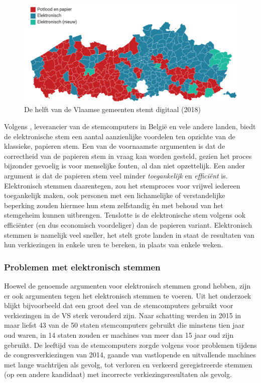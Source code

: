 			\begin{figure}
				\includegraphics[width=\linewidth]{img/evote_vlaanderen.png}
				\caption{De helft van de Vlaamse gemeenten stemt digitaal (2018)}
				\label{fig:evote_vlaanderen}
			\end{figure}
			
			Volgens \textcite{Smartmatic2018}, leverancier van de stemcomputers in België en vele andere landen, biedt de elektronische stem een aantal aanzienlijke voordelen ten opzichte van de klassieke, papieren stem. Een van de voornaamste argumenten is dat de correctheid van de papieren stem in vraag kan worden gesteld, gezien het proces bijzonder gevoelig is voor menselijke fouten, al dan niet opzettelijk. Een ander argument is dat de papieren stem veel minder \textit{toegankelijk} en \textit{efficiënt} is. Elektronisch stemmen daarentegen, zou het stemproces voor vrijwel iedereen toegankelijk maken, ook personen met een lichamelijke of verstandelijke beperking zouden hiermee hun stem zelfstandig èn met behoud van het stemgeheim kunnen uitbrengen. Tenslotte is de elektronische stem volgens \textcite{Smartmatic2018} ook efficiënter (en dus economisch voordeliger) dan de papieren variant. Elektronisch stemmen is namelijk veel sneller, het stelt grote landen in staat de resultaten van hun verkiezingen in enkele uren te bereken, in plaats van enkele weken. ~\autocite{Smartmatic2018}
			
			\subsubsection{Problemen met elektronisch stemmen}
			Hoewel de genoemde argumenten voor elektronisch stemmen grond hebben, zijn er ook argumenten tegen het elektronisch stemmen te voeren. Uit het onderzoek \textcite{Norden2015} blijkt bijvoorbeeld dat een groot deel van de stemcomputers gebruikt voor verkiezingen in de VS sterk verouderd zijn. Naar schatting werden in 2015 in maar liefst 43 van de 50 staten stemcomputers gebruikt die minstens tien jaar oud waren, in 14 staten zouden er machines van meer dan 15 jaar oud zijn gebruikt. De leeftijd van de stemcomputers zorgde volgens \textcite{Norden2015}  voor problemen tijdens de congresverkiezingen van 2014, gaande van vastlopende en uitvallende machines met lange wachtrijen als gevolg, tot verloren en verkeerd geregistreerde stemmen (op een andere kandidaat) met incorrecte verkiezingsresultaten als gevolg.
			
